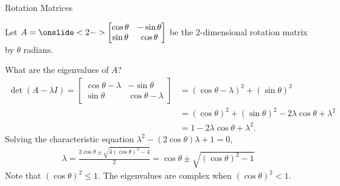 \documentclass[xcolor=dvipsnames,aspectratio=169,t]{beamer}
\begin{document}
\begin{frame}{Rotation Matrices}
  \medskip
  
  Let $A=\onslide<2->{\begin{bmatrix} \cos \theta & -\sin \theta \\ \sin \theta & \cos\theta \end{bmatrix}}$ be the $2$-dimensional rotation matrix by $\theta$ radians.
  \medskip
  
  \pause\pause
  What are the \alert{eigenvalues} of $A$?
  \begin{align*}
    \det(A-\lambda I) = 
    \begin{bmatrix} \cos\theta -\lambda & -\sin \theta \\ \sin \theta & \cos\theta -\lambda \end{bmatrix}
    &= (\cos\theta-\lambda)^2+(\sin\theta)^2 \\
    &= (\cos\theta)^2+(\sin\theta)^2 - 2\lambda\cos\theta +\lambda^2 \\
    &= 1 - 2\lambda\cos\theta +\lambda^2.
  \end{align*}
  \pause
  Solving the characteristic equation $\lambda^2 - (2\cos\theta)\lambda +1 = 0$,
  \begin{align*}
    \lambda =  \frac{2\cos\theta \pm \sqrt{4(\cos\theta)^2-4}}{2}
            = \cos\theta \pm \sqrt{(\cos\theta)^2-1}
  \end{align*}
  Note that $(\cos\theta)^2\le 1$.
  The eigenvalues are \alert{complex} when $(\cos\theta)^2 < 1$.
  
\end{frame}
\end{document}
